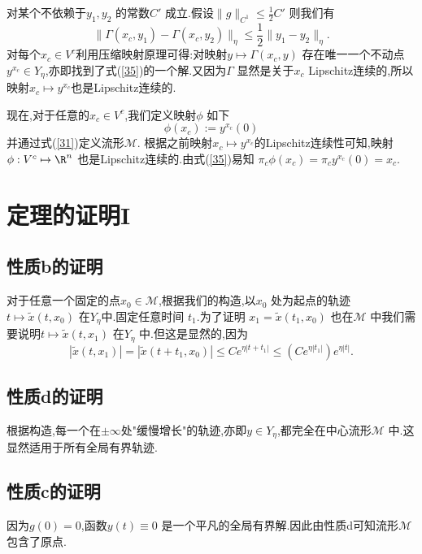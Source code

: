 对某个不依赖于$y_1,y_2$ 的常数$C'$ 成立.假设$\|g\|_{C^{1}}\le \frac{1}{2}C'$ 则我们有
\begin{equation}
  \|\Gamma(x_c,y_1)-\Gamma(x_c,y_2)\|_{\eta}\le \frac{1}{2}\|y_1-y_2\|_{\eta}.\label{37}
\end{equation}
对每个$x_c\in V^{c}$利用压缩映射原理可得:对映射$y\mapsto \Gamma(x_c,y)$ 存在唯一一个不动点$y^{x_c}\in Y_{\eta}$,亦即找到了式(\ref{35})的一个解.又因为$\Gamma$ 显然是关于$x_c$ Lipschitz连续的,所以映射$x_c\mapsto y^{x_c}$也是Lipschitz连续的.

现在,对于任意的$x_c\in V^{c}$,我们定义映射$\phi$ 如下
\begin{equation}
  \phi(x_c):=y^{x_c}(0)
\end{equation}
并通过式(\ref{31})定义流形$\mathcal{M}$. 根据之前映射$x_c\mapsto y^{x_c}$的Lipschitz连续性可知,映射 $\phi:V^{c}\mapsto \R^{n}$ 也是Lipschitz连续的.由式(\ref{35})易知 $\pi_c\phi(x_c)=\pi_cy^{x_c}(0)=x_c$.
\section{定理的证明I}
\subsection{性质b的证明}
对于任意一个固定的点$x_0\in \mathcal{M}$,根据我们的构造,以$x_0$ 处为起点的轨迹$t\mapsto \tilde{x}(t,x_0)$ 在$Y_\eta$中.固定任意时间 $t_1$.为了证明 $x_1=\tilde{x}(t_1,x_0)$ 也在$\mathcal{M}$ 中我们需要说明$t\mapsto \tilde{x}(t,x_1)$ 在$Y_\eta$ 中.但这是显然的,因为
\[
  \left| \tilde{x}(t,x_1) \right| =\left| \tilde{x}(t+t_1,x_0) \right| \le Ce^{\eta\left| t+t_1 \right| }\le \left( Ce^{\eta\left| t_1 \right| } \right) e^{\eta\left| t \right| }.
\] 
\subsection{性质d的证明}
根据构造,每一个在$\pm \infty$处"缓慢增长"的轨迹,亦即$y\in  Y_\eta$,都完全在中心流形$\mathcal{M}$ 中.这显然适用于所有全局有界轨迹.
\subsection{性质c的证明}
因为$g(0)=0$,函数$y(t)\equiv 0$ 是一个平凡的全局有界解.因此由性质d可知流形$\mathcal{M}$ 包含了原点.


